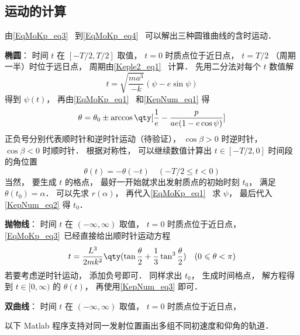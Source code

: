 \subsection{运动的计算}
由\autoref{EqMoKp_eq3}~ 到\autoref{EqMoKp_eq4}~ 可以解出三种圆锥曲线的含时运动．

\textbf{椭圆}： 时间 $t$ 在 $[-T/2,T/2]$ 取值， $t=0$ 时质点位于近日点， $t=T/2$ （周期一半）时位于远日点， 周期由\autoref{Keple2_eq1}~ 计算． 先用二分法对每个 $t$ 数值解
\begin{equation}\label{KepNum_eq2}
t = \sqrt{\frac{ma^3}{-k}} (\psi - e \sin\psi)
\end{equation}
得到 $\psi(t)$， 再由\autoref{EqMoKp_eq1}~ 和\autoref{KepNum_eq1} 得
\begin{equation}
\theta = \theta_0 \pm \arccos\qty[\frac{1}{e} - \frac{p}{ae(1-e\cos\psi)}]
\end{equation}
正负号分别代表顺时针和逆时针运动（待验证）， $\cos\beta > 0$ 时逆时针， $\cos\beta < 0$ 时顺时针． 根据对称性， 可以继续数值计算出 $t\in[-T/2,0]$ 时间段的角位置
\begin{equation}\label{KepNum_eq3}
\theta(t) = -\theta(-t) \quad (-T/2\leqslant t < 0)
\end{equation}
当然， 要生成 $t$ 的格点， 最好一开始就求出发射质点的初始时刻 $t_0$， 满足 $\theta(t_0) = \alpha$． 可以先求 $r(\alpha)$， 再代入\autoref{EqMoKp_eq1}~ 求 $\psi$， 最后代入\autoref{KepNum_eq2} 得 $t_0$．

\textbf{抛物线}： 时间 $t$ 在 $(-\infty,\infty)$ 取值， $t=0$ 时质点位于近日点， \autoref{EqMoKp_eq3}~已经直接给出顺时针运动方程
\begin{equation}
t = \frac{L^3}{2mk^2} \qty(\tan\frac{\theta}{2} +  \frac{1}{3}\tan^3 \frac{\theta}{2}) \quad (0\leqslant \theta<\pi)
\end{equation}
若要考虑逆时针运动， 添加负号即可． 同样求出 $t_0$， 生成时间格点， 解方程得到 $t\in[0,\infty)$ 的 $\theta(t)$， 再使用\autoref{KepNum_eq3} 即可．

\textbf{双曲线}： 时间 $t$ 在 $(-\infty,\infty)$ 取值， $t=0$ 时质点位于近日点，

以下 Matlab 程序支持对同一发射位置画出多组不同初速度和仰角的轨道．

